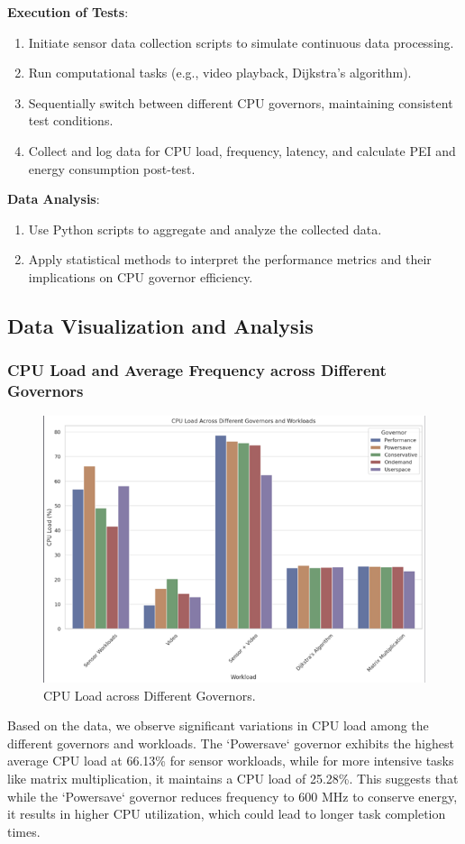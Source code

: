 \documentclass[conference]{IEEEtran}
\begin{document}
\textbf{Execution of Tests}:
\begin{enumerate}
    \item Initiate sensor data collection scripts to simulate continuous data processing.
    \item Run computational tasks (e.g., video playback, Dijkstra's algorithm).
    \item Sequentially switch between different CPU governors, maintaining consistent test conditions.
    \item Collect and log data for CPU load, frequency, latency, and calculate PEI and energy consumption post-test.
\end{enumerate}

\textbf{Data Analysis}:
\begin{enumerate}
    \item Use Python scripts to aggregate and analyze the collected data.
    \item Apply statistical methods to interpret the performance metrics and their implications on CPU governor efficiency.
\end{enumerate}
\subsection{Data Visualization and Analysis}
\subsubsection{CPU Load and Average Frequency across Different Governors}
\begin{figure}[ht]
    \centering
    \includegraphics[width=0.75\linewidth]{cpu_load_freq_plot.png}
    \caption{CPU Load across Different Governors.}
    \label{fig:cpu_load_freq}
\end{figure}
\vspace{10pt}
Based on the data, we observe significant variations in CPU load among the different governors and workloads. The `Powersave` governor exhibits the highest average CPU load at 66.13\% for sensor workloads, while for more intensive tasks like matrix multiplication, it maintains a CPU load of 25.28\%. This suggests that while the `Powersave` governor reduces frequency to 600 MHz to conserve energy, it results in higher CPU utilization, which could lead to longer task completion times.
\end{document}
